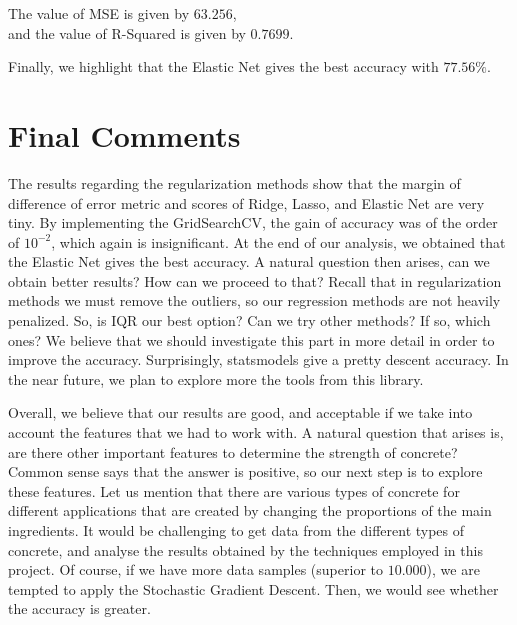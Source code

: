 \documentclass[a4paper,11pt]{amsart}
\begin{document}
\medbreak

\begin{flushleft}
The value of MSE is given by $63.256$,\\ 
 and the value of R-Squared is given by $0.7699$.
\end{flushleft}

\medbreak

Finally, we highlight that the Elastic Net gives the best accuracy with $77.56\%$.
\section{Final Comments}\label{future}

The results regarding the regularization methods show that the margin of difference of error metric and scores of Ridge, Lasso, and Elastic Net are very tiny. By implementing the GridSearchCV, the gain of accuracy was of the order of $10^{-2}$, which again is insignificant. At the end of our analysis, we obtained that the Elastic Net gives the best accuracy. A natural question then arises, can we obtain better results? How can we proceed to that? Recall that in regularization methods we must remove the outliers, so our regression methods are not heavily penalized. So, is IQR our best option? Can we try other methods? If so, which ones? We believe that we should investigate this part in more detail in order to improve the accuracy. Surprisingly, statsmodels give a pretty descent accuracy. In the near future, we plan to explore more the tools from this library. 

\medbreak

Overall, we believe that our results are good, and acceptable if we take into account the features that we had to work with. A natural question that arises is, are there other important features to determine the strength of concrete? Common sense says that the answer is positive, so our next step is to explore these features. Let us mention that there are various types of concrete for different applications that are created by changing the proportions of the main ingredients. It would be challenging to get data from the different types of concrete, and analyse the results obtained by the techniques employed in this project. Of course, if we have more data samples (superior to $10.000$), we are tempted to apply the Stochastic Gradient Descent. Then, we would see whether the accuracy is greater. 
\end{document}
